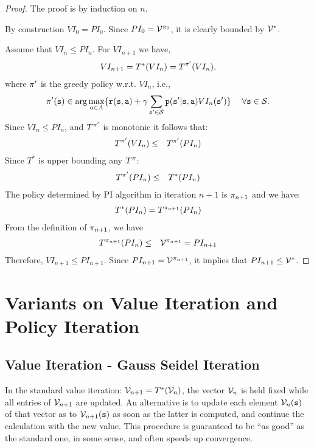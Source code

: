 \begin{proof} The proof is by induction on $n$.

 By construction  $VI_0=PI_0$.
%
Since $PI_0=\mathcal{V}^{\pi_0}$, it is clearly bounded by
$\mathcal{V}^*$.

 Assume that $VI_n\leq PI_n$. For
$VI_{n+1}$ we have,
\begin{eqnarray*}
VI_{n+1} = T^*(VI_{n}) = T^{\pi'}(VI_{n}),
\end{eqnarray*}
where  $\pi'$ is the greedy policy w.r.t. $VI_n$, i.e.,
$$
\pi'({\tt s}) \in \arg\max_{a\in A}\{{\tt r}({\tt s},{\tt a}) +
\gamma \sum_{{\tt s}'\in \mathcal{S}}
{\tt p}({\tt s}'|{\tt s},{\tt a})VI_{n}({\tt s}')\} \quad\;\forall{\tt s}\in\mathcal{S}.
$$
Since $VI_n \leq PI_n$, and $T^{\pi'}$ is monotonic it follows
that:
\begin{eqnarray*}
T^{\pi'}(VI_{n}) & \leq &T^{\pi'}(PI_{n})
\end{eqnarray*}
Since $T^*$ is upper bounding any $T^\pi$:
\begin{eqnarray*}
T^{\pi'}(PI_{n}) & \leq & T^*(PI_{n})
\end{eqnarray*}
The policy determined by PI algorithm in iteration $n+1$ is
$\pi_{n+1}$ and we have:
\begin{eqnarray*}
T^*(PI_{n})=T^{\pi_{n+1}}(PI_{n})
\end{eqnarray*}
From the definition of $\pi_{n+1}$, we have
\begin{eqnarray*}
T^{\pi_{n+1}}(PI_{n}) &\leq& \mathcal{V}^{\pi_{n+1}}=PI_{n+1}
\end{eqnarray*}
Therefore, $VI_{n+1} \leq PI_{n+1}$. Since
$PI_{n+1}=\mathcal{V}^{\pi_{n+1}}$, it implies that $PI_{n+1}\leq
\mathcal{V}^*$.
\end{proof}


\section{Variants on Value Iteration and Policy Iteration}

\subsection{Value Iteration - Gauss Seidel Iteration}
In the standard value iteration: ${\mathcal{V}_{n + 1}} =
T_{}^*({\mathcal{V}_n})$, the vector ${\mathcal{V}_n}$ is held fixed while all
entries of ${\mathcal{V}_{n + 1}}$ are updated. An alternative is to
update each element ${\mathcal{V}_n}({\tt s})$ of that vector as to
${\mathcal{V}_{n + 1}}({\tt s})$ as soon as the latter is computed, and
continue the calculation with the new value. This procedure is
guaranteed to be ``as good'' as the standard one, in some sense, and
often speeds up convergence.


